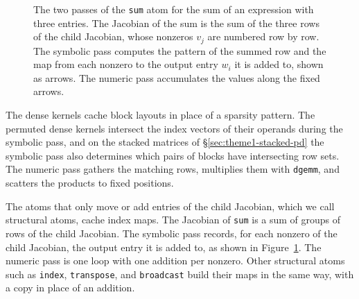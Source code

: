 \begin{figure}[htbp]
\caption{The two passes of the \texttt{sum} atom for the sum of an expression with three
entries. The Jacobian of the sum is the sum of the three rows of the child Jacobian, whose
nonzeros $v_j$ are numbered row by row. The symbolic pass computes the pattern of the
summed row and the map from each nonzero to the output entry $w_i$ it is added to, shown
as arrows. The numeric pass accumulates the values along the fixed arrows.}
\label{fig:sum-idx-map}
\end{figure}

The dense kernels cache block layouts in place of a sparsity pattern.
The permuted dense kernels intersect the index vectors of their operands during the
symbolic pass, and on the stacked matrices of \S\ref{sec:theme1-stacked-pd} the symbolic
pass also determines which pairs of blocks have intersecting row sets. The numeric pass
gathers the matching rows, multiplies them with
\texttt{dgemm}, and scatters the products to fixed positions.

The atoms that only move or add entries of the child Jacobian, which we call structural
atoms, cache index maps. The Jacobian of \texttt{sum} is a sum of groups of rows of the
child Jacobian. The symbolic pass records, for each nonzero of the child Jacobian, the
output entry it is added to, as shown in Figure~\ref{fig:sum-idx-map}. The numeric pass is
one loop with one addition per nonzero. Other structural atoms such as \texttt{index},
\texttt{transpose}, and \texttt{broadcast} build their maps in the same way, with a copy in
place of an addition.

